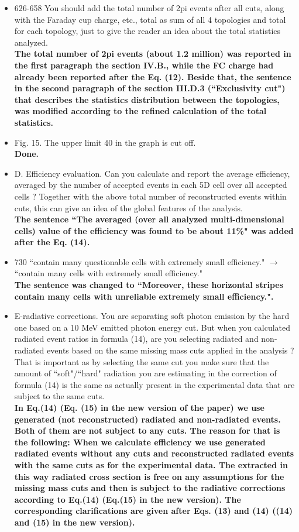 \documentclass[,superscriptaddress,showpacs,amssymb,amsmath,amsfonts,linenumbers,article]{revtex4-1}
\begin{document}
\begin{itemize}
\item 626-658 You should add the total number of 2pi events after all cuts, along with the Faraday cup
charge, etc., total as sum of all 4 topologies and total for each topology, just to give the reader an
idea about the total statistics analyzed.\\
{\bf The total number of 2pi events (about 1.2 million) was reported in the first paragraph the section IV.B., while the FC charge had already been reported after the Eq. (12). Beside that, the sentence in the second paragraph of the section III.D.3 (``Exclusivity cut") that describes the statistics distribution between the topologies, was modified according to the refined calculation of the total statistics. }

\item Fig. 15. The upper limit 40 in the graph is cut off.\\
{\bf Done.}

\item D. Efficiency evaluation. Can you calculate and report the average efficiency, averaged by the
number of accepted events in each 5D cell over all accepted cells ? Together with the above total
number of reconstructed events within cuts, this can give an idea of the global features of the
analysis.\\
{\bf The sentence ``The averaged (over all analyzed multi-dimensional cells) value of the efficiency was found to be about 11\%" was added after the Eq. (14).}

\item 730 ``contain many questionable cells with extremely small efficiency." $\rightarrow$ ``contain many cells with
extremely small efficiency."\\
{\bf The sentence was changed to ``Moreover, these horizontal stripes contain many cells with unreliable extremely small efficiency.".}

\item E-radiative corrections. You are separating soft photon emission by the hard one based on a 10 MeV emitted photon energy cut. But when you calculated radiated event ratios in formula (14), are you selecting radiated and non-radiated events based on the same missing mass cuts applied in the
analysis ? That is important as by selecting the same cut you make sure that the amount of ``soft"/``hard" radiation you are estimating in the correction of formula (14) is the same as actually present in the experimental data that are subject to the same cuts.\\
{\bf In Eq.(14) (Eq. (15) in the new version of the paper) we use generated (not reconstructed) radiated and non-radiated events. Both of them are not subject to any cuts. The reason for that is the following: When we calculate efficiency we use generated radiated events without any cuts and reconstructed radiated events with the same cuts as for the experimental data. The extracted in this way radiated cross section is free on any assumptions for the missing mass cuts and then is subject to the radiative corrections according to Eq.(14) (Eq.(15) in the new version). The corresponding clarifications are given after Eqs. (13) and (14) ((14) and (15) in the new version).}


\end{itemize}
\end{document}
